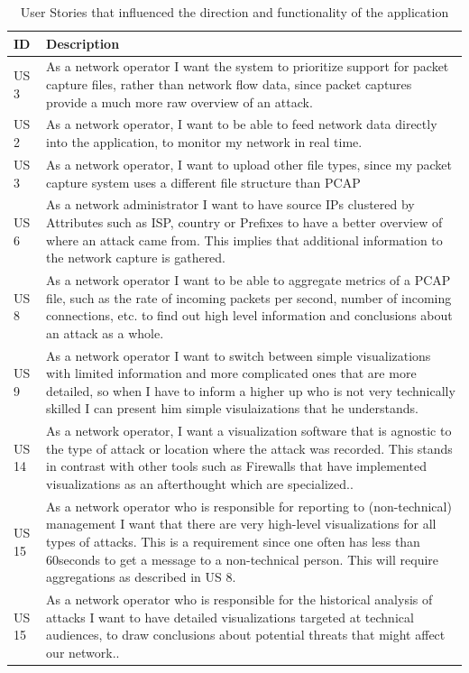 \begin{table}[]
\centering
\begin{tabular}{|p{1.1cm}|p{12cm}|}
\hline
\textbf{ID} & \textbf{Description} \\ \hline

US 3         & As a network operator I want the system to prioritize support for packet capture files, rather than network flow data, since packet captures provide a much more raw overview of an attack. \\ \hline
US 2         & As a network operator, I want to be able to feed network data directly into the application, to monitor my network in real time.\\ \hline
US 3         & As a network operator, I want to upload other file types, since my packet capture system uses a different file structure than PCAP\\ \hline
US 6         & As a network administrator I want to have source IPs clustered by Attributes such as ISP, country or Prefixes to have a better overview of where an attack came from. This implies that additional information to the network capture is gathered.\\ \hline
US 8         & As a network operator I want to be able to aggregate metrics of a PCAP file, such as the rate of incoming packets per second, number of incoming connections, etc. to find out high level information and conclusions about an attack as a whole.\\ \hline
US 9         & As a network operator I want to switch between simple visualizations with limited information and more complicated ones that are more detailed, so when I have to inform a higher up who is not very technically skilled I can present him simple visulaizations that he understands.\\ \hline
US 14       & As a network operator, I want a visualization software that is agnostic to the type of attack or location where the attack was recorded. This stands in contrast with other tools such as Firewalls that have implemented visualizations as an afterthought which are specialized.\cite{appliedsecurityvisualizations}.\\ \hline
US 15       & As a network operator who is responsible for reporting to (non-technical) management I want that there are very high-level visualizations for all types of attacks. This is a requirement since one often has less than 60seconds to get a message to a non-technical person\cite{appliedsecurityvisualizations}. This will require aggregations as described in US 8.\\ \hline
US 15       & As a network operator who is responsible for the historical analysis of attacks I want to have detailed visualizations targeted at technical audiences, to draw conclusions about potential threats that might affect our network.\cite{appliedsecurityvisualizations}.\\ \hline

\end{tabular}
\caption{User Stories that influenced the direction and functionality of the application}
\label{table:1}
\end{table} 

